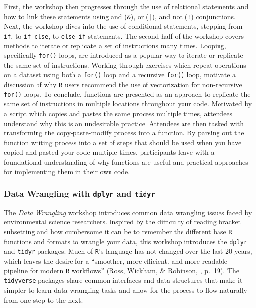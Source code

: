 \documentclass[12pt]{article}
\begin{document}
\quad First, the workshop then progresses through the use of relational
statements and how to link these statements using and (\texttt{\&}), or
(\texttt{|}), and not (\texttt{!}) conjunctions. Next, the workshop dives into
the use of conditional statements, stepping from \texttt{if}, to \texttt{if
else}, to \texttt{else if} statements. The second half of the workshop covers
methods to iterate or replicate a set of instructions many times. Looping,
specifically \texttt{for()} loops, are introduced as a popular way to iterate or
replicate the same set of instructions. Working through exercises which
repeat operations on a dataset using both a \texttt{for()} loop and a recursive 
\texttt{for()} loop, motivate a discussion of why \texttt{R} users recommend the
use of vectorization for non-recursive \texttt{for()} loops. To conclude,
functions are presented as an approach to replicate the same set of instructions
in multiple locations throughout your code. Motivated by a script which copies 
and pastes the same process multiple times, attendees understand why this is 
an undesirable practice. Attendees are then tasked with transforming the
copy-paste-modify process into a function. By parsing out the function writing
process into a set of steps that should be used when you have copied and pasted
your code multiple times, participants leave with a foundational understanding
of why functions are useful and practical approaches for implementing them in
their own code.

\subsubsection{Data Wrangling with \texttt{dplyr} and \texttt{tidyr}}
\label{sec:wrangle}

\quad The \emph{Data Wrangling} workshop introduces common data wrangling issues
faced by environmental science researchers. Inspired by the difficulty of
reading bracket subsetting and how cumbersome it can be to remember the
different base \texttt{R} functions and formats to wrangle your data, this
workshop introduces the \texttt{dplyr} \citep{dplyr} and \texttt{tidyr} 
\citep{tidyr} packages. Much of \texttt{R}'s language has not changed over the
last 20 years, which leaves the desire for a ``smoother, more efficient, and
more readable pipeline for modern \texttt{R} workflows'' (Ross, Wickham, 
\& Robinson, \citeyear{tidytools}, p.\ 19). The \texttt{tidyverse} packages
share common interfaces and data structures that make it simpler to learn data
wrangling tasks and allow for the process to flow naturally from one step to the
next. 
\end{document}

